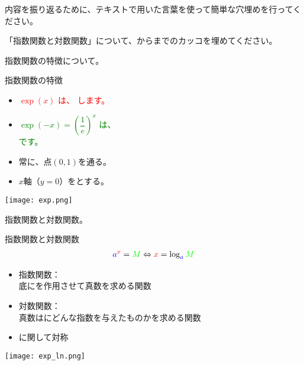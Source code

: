 \documentclass[uplatex,dvipdfmx,a4paper,11pt]{jsarticle}
\begin{document}
内容を振り返るために、テキストで用いた言葉を使って簡単な穴埋めを行ってください。
\begin{qlist}
	\qitem 「指数関数と対数関数」について、からまでのカッコを埋めてください。
		\begin{qlist2}
			\qitem 指数関数の特徴について。
			\begin{center}
				\begin{minipage}{0.48\textwidth}
					\begin{itembox}[l]{指数関数の特徴}
						\begin{itemize}
							\item \textcolor{red}{$\exp (x)$ は、\qbox{} します。}
							\item \textcolor{green}{$\exp (-x) = \left(\dfrac{1}{e} \right)^x$ は、\\\qbox{} です。}
							\item 常に、点$(0,1)$を通る。
							\item $x$軸（$y=0$）を\qbox{}とする。
						\end{itemize}
					\end{itembox}
				\end{minipage}
				\begin{minipage}{0.4\textwidth}
					\begin{center}
					\texttt{[image: exp.png]}
					\end{center}
				\end{minipage}
			\end{center}
			
			\qitem 指数関数と対数関数。
			\begin{center}
				\begin{minipage}{0.48\textwidth}
					\begin{itembox}[l]{指数関数と対数関数}
						\vspace{-3mm}
						\begin{align*}
							\textcolor{blue}{a}^{\textcolor{red}{x}} = \textcolor{green}{M} \Leftrightarrow \textcolor{red}{x}= \log_{\textcolor{blue}{a}} \textcolor{green}{M}
						\end{align*}
						\begin{itemize}
							\item 指数関数：\\底に\qbox{}を作用させて真数を求める関数
							\item 対数関数：\\真数は\qbox{}にどんな指数を与えたものかを求める関数
							\item \qbox{}に関して対称
						\end{itemize}
					\end{itembox}
				\end{minipage}
				\begin{minipage}{0.4\textwidth}
					\begin{center}
					\texttt{[image: exp\_ln.png]}
					\end{center}
				\end{minipage}
			\end{center}


\end{qlist2}
\end{qlist}
\end{document}
